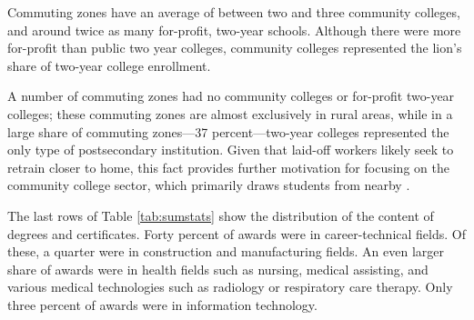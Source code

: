 Commuting zones have an average of between two and three community colleges, and around twice as many for-profit, two-year schools. Although there were more for-profit than public two year colleges, community colleges represented the lion's share of two-year college enrollment. 


A number of commuting zones had no community colleges or for-profit two-year colleges; these commuting zones are almost exclusively in rural areas, while in a large share of commuting zones---37 percent---two-year colleges represented the only type of postsecondary institution. Given that laid-off workers likely seek to retrain closer to home, this fact provides further motivation for focusing on the community college sector, which primarily draws students from nearby \citep{rouse1995}. 

The last rows of Table \ref{tab:sumstats} show the distribution of the content of degrees and certificates. Forty percent of awards were in career-technical fields. Of these, a quarter were in construction and manufacturing fields. An even larger share of awards were in health fields such as nursing, medical assisting, and various medical technologies such as radiology or respiratory care therapy. Only three percent of awards were in information technology. 
